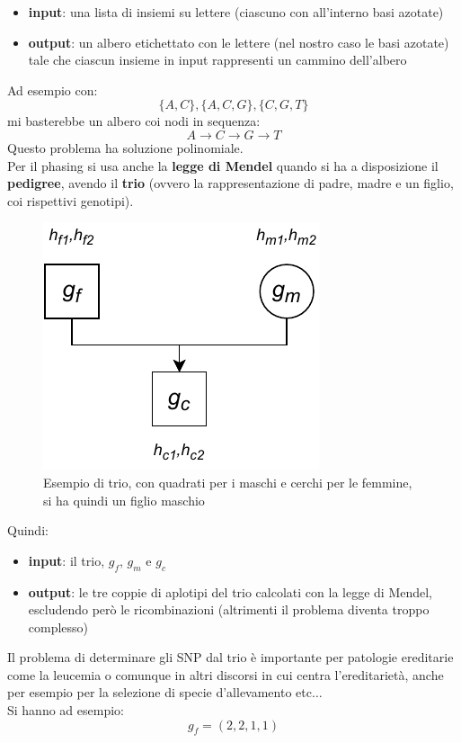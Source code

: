 \documentclass[a4paper,12pt, oneside]{book}
\begin{document}
\begin{esempio}
\begin{itemize}
    \item \textbf{input}: una lista di insiemi su lettere (ciascuno con
    all'interno basi azotate)
    \item \textbf{output}: un albero etichettato con le lettere (nel nostro caso
    le basi azotate) tale che ciascun insieme in input rappresenti un cammino
    dell'albero 
  \end{itemize}
  Ad esempio con:
  \[\{A,C\},\{A,C,G\},\{C,G,T\}\]
  mi basterebbe un albero coi nodi in sequenza:
  \[A\to C\to G\to T\]
  Questo problema ha soluzione polinomiale.\\
  Per il phasing si usa anche la \textbf{legge di Mendel} quando si ha a
  disposizione il \textbf{pedigree}, avendo il \textbf{trio} (ovvero la
  rappresentazione di padre, madre e un figlio, coi rispettivi genotipi).
  \begin{figure}[H]
    \centering
    \includegraphics[scale = 1]{img/trio.pdf}
    \caption{Esempio di trio, con quadrati per i maschi e cerchi per le femmine,
    si ha quindi un figlio maschio}
  \end{figure}
  Quindi:
  \begin{itemize}
    \item \textbf{input}: il trio, $g_f$, $g_m$ e $g_c$
    \item \textbf{output}: le tre coppie di aplotipi del trio calcolati con la
    legge di Mendel, escludendo però le ricombinazioni (altrimenti il problema
    diventa troppo complesso)
  \end{itemize}
  Il problema di determinare gli SNP dal trio è importante per patologie
  ereditarie come la leucemia o comunque in altri discorsi in cui centra
  l'ereditarietà, anche per esempio per la selezione di specie d'allevamento
  etc$\ldots$\\
  Si hanno ad esempio:
  \[g_f=(2,2,1,1)\]

\end{esempio}
\end{document}
